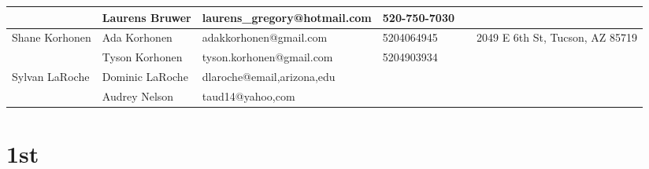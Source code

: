 \documentclass[landscape]{article}\usepackage[]{graphicx}\usepackage[]{color}
\begin{document}
\begin{longtable}{|p{100pt}|p{100pt}|p{140pt}|p{60pt}|p{64pt}|p{120pt}|}
 & Laurens Bruwer & laurens\_gregory@hotmail.com & 520-750-7030 &  & \\
\hline
\multirow{2}{100pt}{Shane Korhonen} & Ada Korhonen & adakkorhonen@gmail.com & 5204064945 &  & \multirow{2}{120pt}{2049 E 6th St, Tucson, AZ 85719} \\
 & Tyson Korhonen & tyson.korhonen@gmail.com & 5204903934 &  & \\
\hline
\multirow{2}{100pt}{Sylvan LaRoche} & Dominic LaRoche & dlaroche@email,arizona,edu &  &  & \multirow{2}{120pt}{} \\
 & Audrey Nelson & taud14@yahoo,com &  &  & \\
\hline
\end{longtable}
\newpage
\section{1st}
\end{document}
